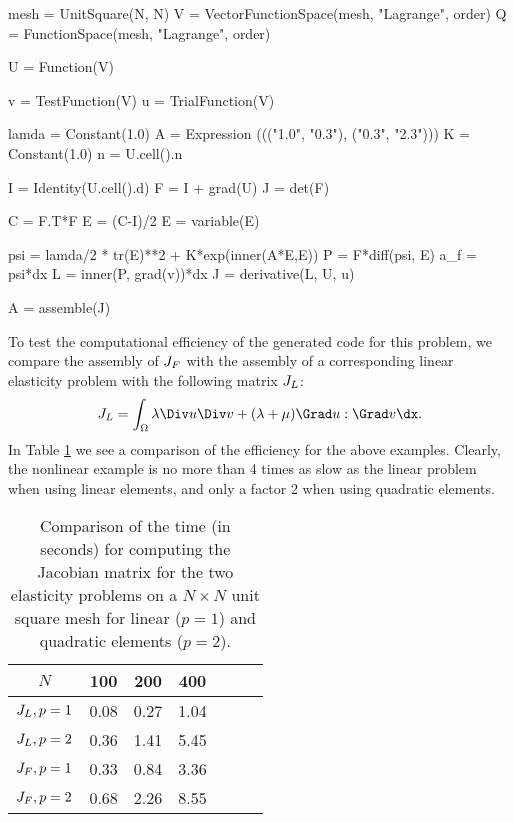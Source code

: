 \pagebreak

\begin{python}
mesh = UnitSquare(N, N)
V = VectorFunctionSpace(mesh, "Lagrange", order)
Q = FunctionSpace(mesh, "Lagrange", order)

U = Function(V)

v = TestFunction(V)
u = TrialFunction(V)

lamda = Constant(1.0)
A = Expression ((("1.0", "0.3"), ("0.3", "2.3")))
K = Constant(1.0)
n = U.cell().n

I = Identity(U.cell().d)
F = I + grad(U)
J = det(F)

C = F.T*F
E = (C-I)/2
E = variable(E)

psi = lamda/2 * tr(E)**2  +  K*exp(inner(A*E,E))
P = F*diff(psi, E)
a_f = psi*dx
L = inner(P, grad(v))*dx
J = derivative(L, U, u)

A = assemble(J)
\end{python}

To test the computational efficiency of the generated code for this
problem, we compare the assembly of $J_F$ with the assembly of a
corresponding linear elasticity problem with the following matrix $J_L$:\vspace*{4pt}
\begin{equation}
\JJ_L = \int_\Omega \lambda \Div u \Div v + (\lambda + \mu)\Grad u: \Grad v \dx.\vspace*{2pt}
\end{equation}
In Table \ref{SFCtest} we see a comparison of the efficiency for the
above examples.  Clearly, the nonlinear example is no more than 4 times
as slow as the linear problem when using linear elements, and only a
factor 2 when using quadratic elements.

\begin{table}[!b]
\linenumbersep-12.2pc
\vspace*{12pt}
\centering
  \begin{tabular}{ccccccc}\toprule
    $N$              & 100   & 200  & 400    \\\midrule
    $J_L, p=1$     & 0.08  & 0.27  & 1.04  \\
    $J_L, p=2$     & 0.36  & 1.41  & 5.45  \\
    $J_F, p=1$     & 0.33  & 0.84  & 3.36  \\
    $J_F, p=2$     & 0.68  & 2.26  & 8.55  \\\bottomrule
  \end{tabular}
\caption{Comparison of the time (in seconds) for computing the Jacobian
    matrix for the two elasticity problems on a $N\times N$ unit square mesh
    for linear ($p=1$) and quadratic elements ($p=2$).}\label{SFCtest}
\end{table}

